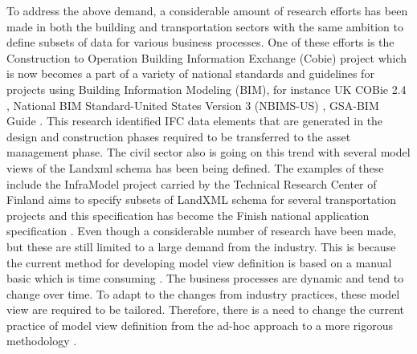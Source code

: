 \documentclass[Journal, InsideFigs, DoubleSpace]{ascelike} %
\begin{document}
To address the above demand, a considerable amount of research efforts has been made in both the building and transportation sectors with the same ambition to define subsets of data for various business processes. One of these efforts is the Construction to Operation Building Information Exchange (Cobie) project \cite{east07} which is now becomes a part of a variety of national standards and guidelines for projects using Building Information Modeling (BIM), for instance UK COBie 2.4 \cite{nisbet12}, National BIM Standard-United States Version 3 (NBIMS-US) \cite{nibs15}, GSA-BIM Guide \cite{gsa11}. This research identified IFC data elements that are generated in the design and construction phases required to be transferred to the asset management phase. The civil sector also is going on this trend with several model views of the Landxml schema has been being defined. The examples of these include the InfraModel project carried by the Technical Research Center of Finland aims to specify subsets of LandXML schema for several transportation projects and this specification has become the Finish national application specification \cite{inframodel14}. Even though a considerable number of research have been made, but these are still limited to a large demand from the industry. This is because the current method for developing model view definition is based on a manual basic which is time consuming \cite{venugopal12,eastman12,hu14}. The business processes are dynamic and tend to change over time. To adapt to the changes from industry practices, these model view are required to be tailored. Therefore, there is a need to change the current practice of model view definition from the ad-hoc approach to a more rigorous methodology \cite{venugopal12}.  %

\end{document}
